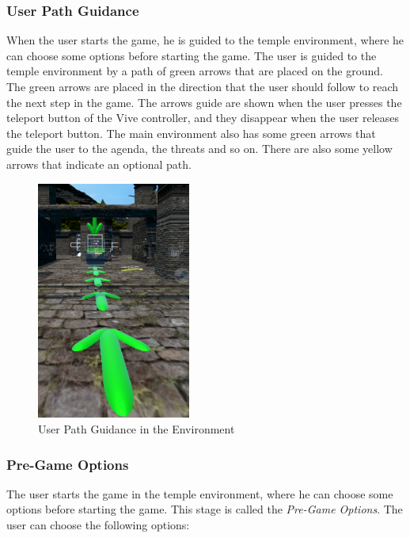\subsubsection{User Path Guidance} \label{subsubsec:user_path_guidance}
When the user starts the game, he is guided to the temple environment, where he can choose some options before starting the game. The user is guided to the temple environment by a path of green arrows that are placed on the ground. The green arrows are placed in the direction that the user should follow to reach the next step in the game. The arrows guide are shown when the user presses the teleport button of the Vive controller, and they disappear when the user releases the teleport button. The main environment also has some green arrows that guide the user to the agenda, the threats and so on. There are also some yellow arrows that indicate an optional path.

\begin{figure}[H]
    \centering
    \includegraphics[width=0.45\textwidth]{images/user_guide.png}
    \caption[User Path Guidance in VR]{User Path Guidance in the Environment}
    \label{fig:vr_user_guide}
\end{figure}

\subsubsection{Pre-Game Options} \label{subsubsec:pre_game_options}

The user starts the game in the temple environment, where he can choose some options before starting the game. This stage is called the \textit{Pre-Game Options}. The user can choose the following options:

